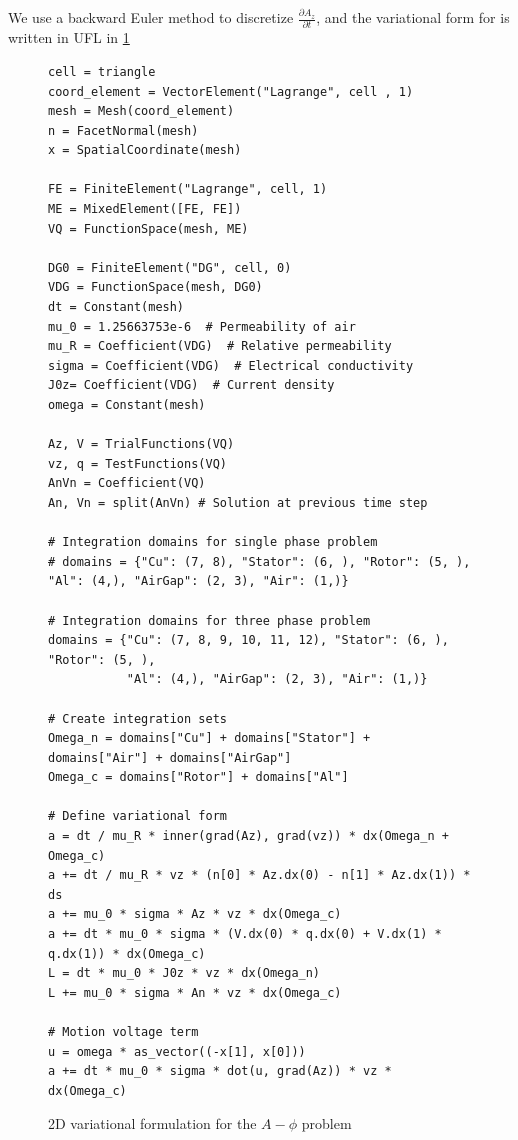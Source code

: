 \documentclass{article}
\newcommand{\ddn}[2]{\frac{\partial #1}{\partial #2}}
\begin{document}
We use a backward Euler method to discretize $\ddn{A_z}{t}$, and the
variational form for  is written in UFL in \cref{code:ufl2D}
\begin{figure}[!ht]
    \centering
    \begin{lstlisting}[style=pythoncustom]
cell = triangle
coord_element = VectorElement("Lagrange", cell , 1)
mesh = Mesh(coord_element)
n = FacetNormal(mesh)
x = SpatialCoordinate(mesh)

FE = FiniteElement("Lagrange", cell, 1)
ME = MixedElement([FE, FE])
VQ = FunctionSpace(mesh, ME)

DG0 = FiniteElement("DG", cell, 0)
VDG = FunctionSpace(mesh, DG0)
dt = Constant(mesh)
mu_0 = 1.25663753e-6  # Permeability of air
mu_R = Coefficient(VDG)  # Relative permeability
sigma = Coefficient(VDG)  # Electrical conductivity
J0z= Coefficient(VDG)  # Current density
omega = Constant(mesh)

Az, V = TrialFunctions(VQ)
vz, q = TestFunctions(VQ)
AnVn = Coefficient(VQ)
An, Vn = split(AnVn) # Solution at previous time step

# Integration domains for single phase problem
# domains = {"Cu": (7, 8), "Stator": (6, ), "Rotor": (5, ), "Al": (4,), "AirGap": (2, 3), "Air": (1,)}

# Integration domains for three phase problem
domains = {"Cu": (7, 8, 9, 10, 11, 12), "Stator": (6, ), "Rotor": (5, ),
           "Al": (4,), "AirGap": (2, 3), "Air": (1,)}

# Create integration sets
Omega_n = domains["Cu"] + domains["Stator"] + domains["Air"] + domains["AirGap"]
Omega_c = domains["Rotor"] + domains["Al"]

# Define variational form
a = dt / mu_R * inner(grad(Az), grad(vz)) * dx(Omega_n + Omega_c)
a += dt / mu_R * vz * (n[0] * Az.dx(0) - n[1] * Az.dx(1)) * ds
a += mu_0 * sigma * Az * vz * dx(Omega_c)
a += dt * mu_0 * sigma * (V.dx(0) * q.dx(0) + V.dx(1) * q.dx(1)) * dx(Omega_c)
L = dt * mu_0 * J0z * vz * dx(Omega_n)
L += mu_0 * sigma * An * vz * dx(Omega_c)

# Motion voltage term
u = omega * as_vector((-x[1], x[0]))
a += dt * mu_0 * sigma * dot(u, grad(Az)) * vz * dx(Omega_c)

    \end{lstlisting}
    \caption{2D variational formulation for the $A-\phi$ problem}
    \label{code:ufl2D}
\end{figure}
\clearpage


\end{document}
